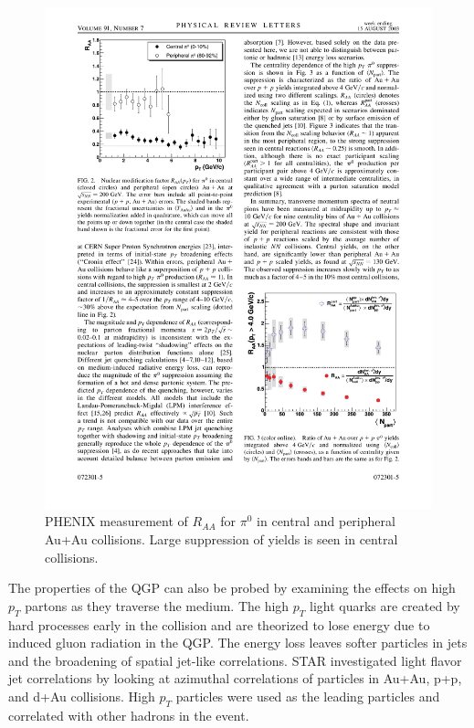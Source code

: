 \begin{figure}[htbp]
\begin{center}
\includegraphics[scale=1.2]{Plots/Intro/pi_RAA.pdf}
\end{center}
\caption[$R_{AA}$ for $\pi^0$]{PHENIX measurement of $R_{AA}$ for $\pi^0$ in central and peripheral Au+Au collisions. Large suppression of yields is seen in central collisions.}
\label{fig:piRAA}
\end{figure}

The properties of the QGP can also be probed by examining the effects on high $p_T$ partons as they traverse the medium. The high $p_T$ light quarks are created by hard processes early in the collision and are theorized to lose energy due to induced gluon radiation in the QGP. The energy loss leaves softer particles in jets and the broadening of spatial jet-like correlations. STAR investigated light flavor jet correlations by looking at azimuthal correlations of particles in Au+Au, p+p, and d+Au collisions. High $p_T$ particles were used as the leading particles and correlated with other hadrons in the event.

